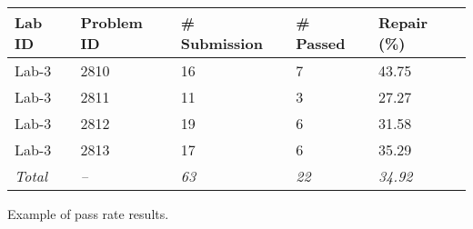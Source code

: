 \begin{tabular}{|l|l|l|l|l|}
\hline
\textbf{Lab ID} & \textbf{Problem ID} & \textbf{\# Submission} & \textbf{\# Passed} & \textbf{Repair (\%)} \\ \hline
Lab-3           & 2810                & 16                     & 7                  & 43.75                \\ \hline
Lab-3           & 2811                & 11                     & 3                  & 27.27                \\ \hline
Lab-3           & 2812                & 19                     & 6                  & 31.58                \\ \hline
Lab-3           & 2813                & 17                     & 6                  & 35.29                \\ \hline
\textit{Total}  & \textit{--}         & \textit{63}            & \textit{22}        & \textit{34.92}       \\ \hline
\end{tabular}
\caption{Example of pass rate results.}
